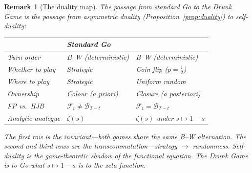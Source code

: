 \documentclass[11pt,a4paper]{article}
\newtheorem{remark}[theorem]{Remark}
\newcommand{\cF}{\mathcal{F}}
\newcommand{\cB}{\mathcal{B}}
\begin{document}
\begin{remark}[The duality map]\label{rem:duality-map}
The passage from standard Go to the Drunk Game is the
passage from asymmetric duality
(Proposition~\ref{prop:duality}) to self-duality:
\medskip
\begin{center}
\begin{tabular}{@{}lll@{}}
\toprule
& \textbf{Standard Go} & \textbf{%
\begin{CJK}{UTF8}{gbsn}醉围棋\end{CJK}
{} (Drunk Go)} \\
\midrule
Turn order & B--W (deterministic) & B--W (deterministic) \\
Whether to play & Strategic & Coin flip ($p = \tfrac{1}{2}$) \\
Where to play & Strategic & Uniform random \\
Ownership & Colour (a priori) & Closure (a posteriori) \\
FP vs.\ HJB & $\cF_t \neq \cB_{T-t}$ & $\cF_t = \cB_{T-t}$ \\
Analytic analogue & $\zeta(s)$
  & $\zeta(s)$ under $s \mapsto 1-s$ \\
\bottomrule
\end{tabular}
\end{center}
\medskip
\noindent
The first row is the invariant---both games share the same
B--W alternation.
The second and third rows are the transcommutation---strategy
$\to$ randomness.
Self-duality is the game-theoretic shadow of the
functional equation.
The Drunk Game is to Go what $s \mapsto 1-s$ is to
the zeta function.
\end{remark}
\end{document}
